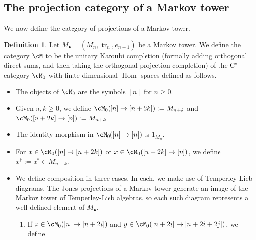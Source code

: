 \documentclass[11pt]{article}
\theoremstyle{plain}
\theoremstyle{definition}
\newtheorem{defn}[thm]{Definition}
\DeclareMathOperator{\Hom}{Hom}
\DeclareMathOperator{\tr}{tr}
\newcommand{\set}[2]{\left\{#1 \middle| #2\right\}}
\newcommand{\Cstar}{\rm{C^*}}
\newcommand{\nn}[1]{\textcolor{red}{[[#1]]}}
\begin{document}
\subsection{The projection category of a Markov tower}

We now define the category of projections of a Markov tower. 


\begin{defn}
\label{def:MarkovProjections}
Let $M_\bullet = (M_n, \tr_n, e_{n+1})$ be a Markov tower.
We define the category $\cM$ to be the unitary Karoubi completion (formally adding orthogonal direct sums, and then taking the orthogonal projection completion) of the $\Cstar$ category $\cM_0$ with finite dimensional $\Hom$-spaces defined as follows.
\begin{itemize}
\item
The objects of $\cM_0$ are the symbols $[n]$ for $n\geq 0$.
\item
Given $n,k \geq 0$, we define 
$\cM_0([n] \to [n+2k]):= M_{n+k}$
and
$\cM_0([n+2k] \to [n]) := M_{n+k}$.
\item
The identity morphism in $\cM_0([n] \to [n])$ is $1_{M_n}$.
\item
For $x\in \cM_0([n]\to [n+2k])$ or $x\in \cM_0([n+2k] \to [n])$, we define $x^\dag := x^* \in M_{n+k}$.
%
\item
We define composition in three cases. In each, we make use of Temperley-Lieb diagrams. The Jones projections of a Markov tower generate an image of the Markov tower of Temperley-Lieb algebras, so each such diagram represents a well-defined element of $M_\bullet$. 
\begin{enumerate}[label={\rm(C\arabic*)}]
\item
\label{compose:upup}
If $x\in \cM_0([n] \to [n+2i])$ and $y\in \cM_0([n+2i] \to [n+2i+2j])$, we define 

\end{enumerate}
\end{itemize}
\end{defn}
\end{document}

